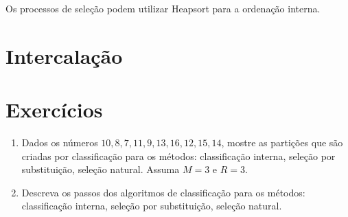 Os processos de seleção podem utilizar Heapsort para a ordenação interna.

\section{Intercalação}

\section{Exercícios}

\begin{enumerate}
\item Dados os números $10, 8, 7, 11, 9, 13, 16, 12, 15, 14$, mostre as partições
que são criadas por classificação para os métodos: classificação interna, seleção
por substituição, seleção natural.
Assuma $M = 3$ e $R = 3$.

\item Descreva os passos dos algoritmos de classificação para os métodos:
classificação interna, seleção por substituição, seleção natural.
\end{enumerate}
